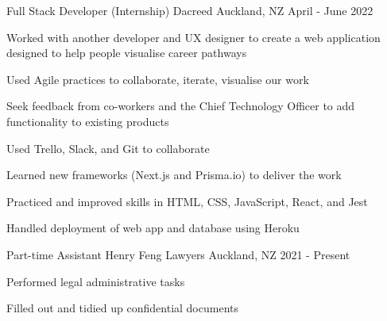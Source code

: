 

\begin{cventries}
  \cventry
    {Full Stack Developer (Internship)} %
    {Dacreed} %
    {Auckland, NZ} %
    {April - June 2022} %
    {
      \begin{cvitems} %
        \item {Worked with another developer and UX designer to create a web application designed to help people visualise career pathways}
        \item {Used Agile practices to collaborate, iterate, visualise our work}
        \item {Seek feedback from co-workers and the Chief Technology Officer to add functionality to existing products}
        \item {Used Trello, Slack, and Git to collaborate}
        \item {Learned new frameworks (Next.js and Prisma.io) to deliver the work}
        \item {Practiced and improved skills in HTML, CSS, JavaScript, React, and Jest}
        \item {Handled deployment of web app and database using Heroku}
      \end{cvitems}
    }

  \cventry
    {Part-time Assistant} %
    {Henry Feng Lawyers} %
    {Auckland, NZ} %
    {2021 - Present} %
    {
      \begin{cvitems} %
        \item {Performed legal administrative tasks}
        \item {Filled out and tidied up confidential documents}
      \end{cvitems}
    }


\end{cventries}
